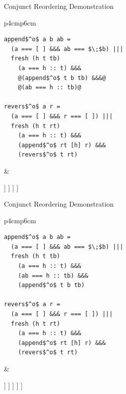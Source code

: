 \documentclass{beamer}
\theoremstyle{definition}
\theoremstyle{plain} %
\begin{document}
\begin{frame}[fragile]{Conjunct Reordering Demonstration}
  \begin{tabular}{p{4cm}p{6cm}}
    \begin{lstlisting}
append$^o$ a b ab =		
  (a === [ ] &&& ab === $\;$b) |||
  fresh (h t tb) 
    (a === h :: t) &&&
    @(append$^o$ t b tb) &&&@
    @(ab === h :: tb)@  
  
revers$^o$ a r =	
  (a === [ ] &&& r === [ ]) |||
  fresh (h t rt) 
    (a === h :: t) &&&
    (append$^o$ rt [h] r) &&&
    (revers$^o$ t rt)
\end{lstlisting}
&
\begin{center}
  \Tree [.{\lstinline|revers$^o\; [1,\,2,\,3]\; r$|}
    [.{$[1,\,2,\,3]\not\equiv [\;]$} ]
    [.{$[1,\,2,\,3]\equiv h_0::t_0$}
      [.{\lstinline|append$^o\;rt_0\;[1]\;r$|}
        [.{$\dots$} ]
        [.{$rt_0\equiv h_1::t_1$} [.{\lstinline|append$^o\;t_1\;[1]\;tb_0$|} ] ]
      ]
    ]
  ]
\end{center}
\end{tabular}
\end{frame}

\begin{frame}[fragile]{Conjunct Reordering Demonstration}
  \begin{tabular}{p{4cm}p{6cm}}
    \begin{lstlisting}
append$^o$ a b ab =		
  (a === [ ] &&& ab === $\;$b) |||
  fresh (h t tb) 
    (a === h :: t) &&&
    (ab === h :: tb) &&&
    (append$^o$ t b tb) 
  
revers$^o$ a r =	
  (a === [ ] &&& r === [ ]) |||
  fresh (h t rt) 
    (a === h :: t) &&&
    (append$^o$ rt [h] r) &&&
    (revers$^o$ t rt)
\end{lstlisting}
&
\begin{center}
 \Tree [.{\lstinline|revers$^o\; [1,\,2,\,3]\; r$|}
    [.{$[1,\,2,\,3]\not\equiv [\;]$} ]
    [.{$[1,\,2,\,3]\equiv h_0::t_0$}
      [.{\lstinline|append$^o\;rt_0\;[1]\;r$|}
        [.{$\dots$} ]
        [.{$rt_0\equiv h_1::t_1$} [.{$r\equiv h_1::tb_0$} [.{\lstinline|append$^o\;t_1\;[1]\;tb_0$|} ] ] ]
      ]
    ]
  ]

\end{center}
\end{tabular}
\end{frame}
\end{document}
